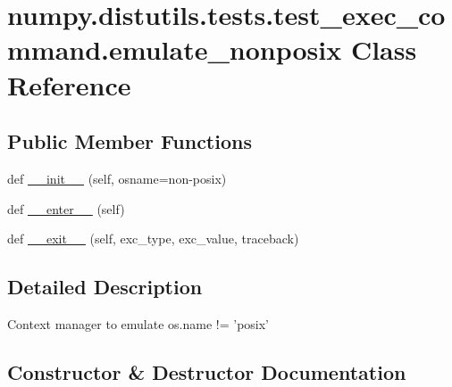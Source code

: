 \hypertarget{classnumpy_1_1distutils_1_1tests_1_1test__exec__command_1_1emulate__nonposix}{}\section{numpy.\+distutils.\+tests.\+test\+\_\+exec\+\_\+command.\+emulate\+\_\+nonposix Class Reference}
\label{classnumpy_1_1distutils_1_1tests_1_1test__exec__command_1_1emulate__nonposix}
\subsection*{Public Member Functions}
\begin{DoxyCompactItemize}
\item 
def \hyperlink{classnumpy_1_1distutils_1_1tests_1_1test__exec__command_1_1emulate__nonposix_a2fa4c6b9ac4363fcc8c3847c4efd7cf5}{\+\_\+\+\_\+init\+\_\+\+\_\+} (self, osname=\textquotesingle{}non-\/posix\textquotesingle{})
\item 
def \hyperlink{classnumpy_1_1distutils_1_1tests_1_1test__exec__command_1_1emulate__nonposix_a5f70f2afe25b4babd869150b00fb9a14}{\+\_\+\+\_\+enter\+\_\+\+\_\+} (self)
\item 
def \hyperlink{classnumpy_1_1distutils_1_1tests_1_1test__exec__command_1_1emulate__nonposix_ac53d0d6b25bd481a0139e761ab87d9e5}{\+\_\+\+\_\+exit\+\_\+\+\_\+} (self, exc\+\_\+type, exc\+\_\+value, traceback)
\end{DoxyCompactItemize}


\subsection{Detailed Description}
\begin{DoxyVerb}Context manager to emulate os.name != 'posix' \end{DoxyVerb}
 

\subsection{Constructor \& Destructor Documentation}
\mbox{\label{classnumpy_1_1distutils_1_1tests_1_1test__exec__command_1_1emulate__nonposix_a2fa4c6b9ac4363fcc8c3847c4efd7cf5}} 
